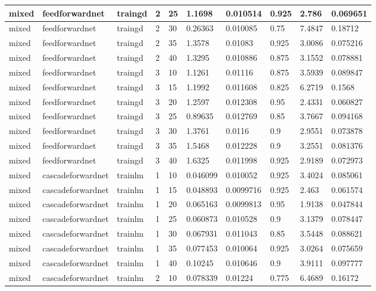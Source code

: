 \begin{longtable}{lllllllll}
mixed & feedforwardnet & traingd & 2 & 25 & 1.1698 & 0.010514 & 0.925 & 2.786 & 0.069651 \\ \hline 
mixed & feedforwardnet & traingd & 2 & 30 & 0.26363 & 0.010085 & 0.75 & 7.4847 & 0.18712 \\ \hline 
mixed & feedforwardnet & traingd & 2 & 35 & 1.3578 & 0.01083 & 0.925 & 3.0086 & 0.075216 \\ \hline 
mixed & feedforwardnet & traingd & 2 & 40 & 1.3295 & 0.010886 & 0.875 & 3.1552 & 0.078881 \\ \hline 
mixed & feedforwardnet & traingd & 3 & 10 & 1.1261 & 0.01116 & 0.875 & 3.5939 & 0.089847 \\ \hline 
mixed & feedforwardnet & traingd & 3 & 15 & 1.1992 & 0.011608 & 0.825 & 6.2719 & 0.1568 \\ \hline 
mixed & feedforwardnet & traingd & 3 & 20 & 1.2597 & 0.012308 & 0.95 & 2.4331 & 0.060827 \\ \hline 
mixed & feedforwardnet & traingd & 3 & 25 & 0.89635 & 0.012769 & 0.85 & 3.7667 & 0.094168 \\ \hline 
mixed & feedforwardnet & traingd & 3 & 30 & 1.3761 & 0.0116 & 0.9 & 2.9551 & 0.073878 \\ \hline 
mixed & feedforwardnet & traingd & 3 & 35 & 1.5468 & 0.012228 & 0.9 & 3.2551 & 0.081376 \\ \hline 
mixed & feedforwardnet & traingd & 3 & 40 & 1.6325 & 0.011998 & 0.925 & 2.9189 & 0.072973 \\ \hline 
mixed & cascadeforwardnet & trainlm & 1 & 10 & 0.046099 & 0.010052 & 0.925 & 3.4024 & 0.085061 \\ \hline 
mixed & cascadeforwardnet & trainlm & 1 & 15 & 0.048893 & 0.0099716 & 0.925 & 2.463 & 0.061574 \\ \hline 
mixed & cascadeforwardnet & trainlm & 1 & 20 & 0.065163 & 0.0099813 & 0.95 & 1.9138 & 0.047844 \\ \hline 
mixed & cascadeforwardnet & trainlm & 1 & 25 & 0.060873 & 0.010528 & 0.9 & 3.1379 & 0.078447 \\ \hline 
mixed & cascadeforwardnet & trainlm & 1 & 30 & 0.067931 & 0.011043 & 0.85 & 3.5448 & 0.088621 \\ \hline 
mixed & cascadeforwardnet & trainlm & 1 & 35 & 0.077453 & 0.010064 & 0.925 & 3.0264 & 0.075659 \\ \hline 
mixed & cascadeforwardnet & trainlm & 1 & 40 & 0.10245 & 0.010646 & 0.9 & 3.9111 & 0.097777 \\ \hline 
mixed & cascadeforwardnet & trainlm & 2 & 10 & 0.078339 & 0.01224 & 0.775 & 6.4689 & 0.16172 \\ \hline 

\end{longtable}
